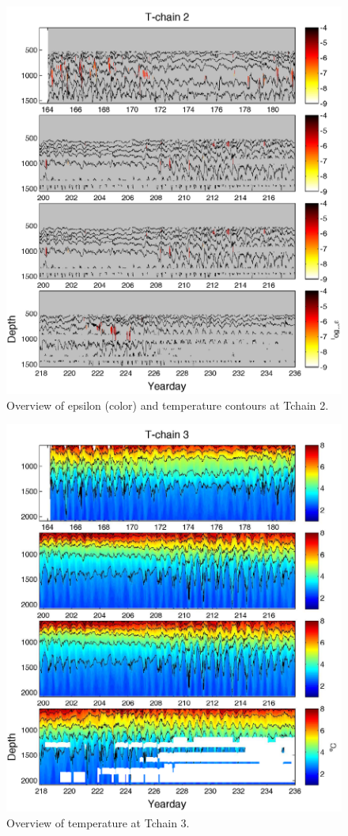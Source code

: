 \documentclass[11pt]{article}
\begin{document}
\begin{figure}[htbp]
\includegraphics[scale=0.9]{Tchain2_EpsilonOverview.pdf}
\caption{Overview of epsilon (color) and temperature contours at Tchain 2.}
\label{}
\end{figure}


\begin{figure}[htbp]
\includegraphics[scale=0.9]{Tchain3_TempOverview.pdf}
\caption{Overview of temperature at Tchain 3.}
\label{}
\end{figure}
\end{document}
